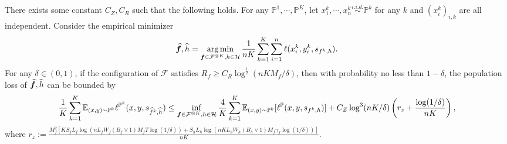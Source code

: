 \documentclass[11pt]{article}
\numberwithin{equation}{section}
\renewcommand{\P}{\mathbb{P}}
\begin{document}
\begin{prop}
\label{prop:generalization_train}
    There exists some constant $C_Z,C_R$ such that the following holds.
    For any $\P^1,\cdots,\P^K$, let $x_1^k,\cdots,x_n^k\overset{\textit{i.i.d.}}{\sim}\P^k$ for any $k$ and $(x_i^k)_{i,k}$ are all independent.
    Consider the empirical minimizer
    \begin{equation}
        \widehat{{\bm{f}}}, \widehat{h}=\operatorname*{arg\,min}_{{\bm{f}}\in\mathcal{F}^{\otimes K},h\in\mathcal{H}} \frac{1}{nK}\sum_{k=1}^K\sum_{i=1}^n \ell(x_i^k,y_i^k,s_{f^k,h}).
    \end{equation}
    For any $\delta\in(0,1)$, if the configuration of $\mathcal{F}$ satisfies $R_f\geq C_R\log^{\frac{1}{2}}(nKM_f/\delta)$, then with probability no less than $1-\delta$,
    the population loss of $\widehat{{\bm{f}}},\widehat{h}$ can be bounded by
    \begin{equation}
        \frac{1}{K}\sum_{k=1}^K\E_{(x,y)\sim\P^k}\ell^{\P^k}(x,y,s_{\widehat{f}^k,\widehat{h}})\leq \inf_{\vf\in\mathcal{F}^{\otimes K},h\in\mathcal{H}}\frac{4}{K}\sum_{k=1}^K\E_{(x,y)\sim\P^k}[\ell^\P(x,y,s_{f^k,h})] + C_Z\log^3(nK/\delta)\left(r_z+\frac{\log(1/\delta)}{nK}\right),
    \end{equation}
    where $r_z:=\frac{M_f^2\left[KS_fL_f\log\left(nL_fW_f(B_f\vee 1)M_fT\log(1/\delta)\right)+S_hL_h\log\left(nKL_hW_h(B_h\vee 1)M_f\gamma_f\log(1/\delta)\right)\right]}{nK}$.
\end{prop}
\end{document}
